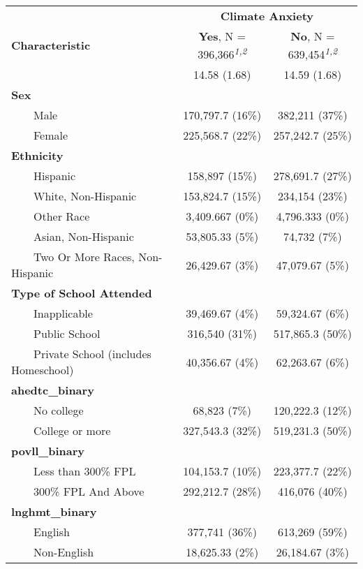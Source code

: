 \begin{table}[t]
\fontsize{12.0pt}{14.4pt}\selectfont
\begin{tabular*}{\linewidth}{@{\extracolsep{\fill}}lcc}
\toprule
 & \multicolumn{2}{c}{\textbf{Climate Anxiety}} \\ 
\cmidrule(lr){2-3}
\textbf{Characteristic} & \textbf{Yes}, N = 396,366\textsuperscript{\textit{1,2}} & \textbf{No}, N = 639,454\textsuperscript{\textit{1,2}} \\ 
\midrule\addlinespace[2.5pt]
{\bfseries Age} & 14.58 (1.68) & 14.59 (1.68) \\ 
{\bfseries Sex} &  &  \\ 
    Male & 170,797.7 (16\%)  & 382,211 (37\%)  \\ 
    Female & 225,568.7 (22\%)  & 257,242.7 (25\%)  \\ 
{\bfseries Ethnicity} &  &  \\ 
    Hispanic & 158,897 (15\%)  & 278,691.7 (27\%)  \\ 
    White, Non-Hispanic & 153,824.7 (15\%)  & 234,154 (23\%)  \\ 
    Other Race & 3,409.667 (0\%)  & 4,796.333 (0\%)  \\ 
    Asian, Non-Hispanic & 53,805.33 (5\%)  & 74,732 (7\%)  \\ 
    Two Or More Races, Non-Hispanic & 26,429.67 (3\%)  & 47,079.67 (5\%)  \\ 
{\bfseries Type of School Attended} &  &  \\ 
    Inapplicable & 39,469.67 (4\%)  & 59,324.67 (6\%)  \\ 
    Public School & 316,540 (31\%)  & 517,865.3 (50\%)  \\ 
    Private School (includes Homeschool) & 40,356.67 (4\%)  & 62,263.67 (6\%)  \\ 
{\bfseries ahedtc\_binary} &  &  \\ 
    No college & 68,823 (7\%)  & 120,222.3 (12\%)  \\ 
    College or more & 327,543.3 (32\%)  & 519,231.3 (50\%)  \\ 
{\bfseries povll\_binary} &  &  \\ 
    Less than 300\% FPL & 104,153.7 (10\%)  & 223,377.7 (22\%)  \\ 
    300\% FPL And Above & 292,212.7 (28\%)  & 416,076 (40\%)  \\ 
{\bfseries lnghmt\_binary} &  &  \\ 
    English & 377,741 (36\%)  & 613,269 (59\%)  \\ 
    Non-English & 18,625.33 (2\%)  & 26,184.67 (3\%)  \\ 

\end{tabular*}
\end{table}
